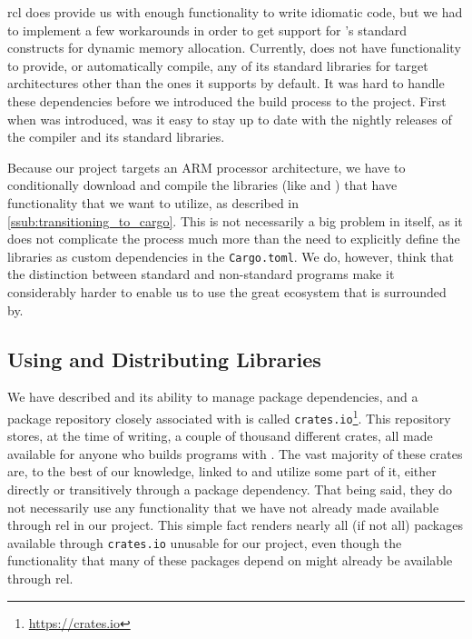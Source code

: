 \gls{rcl} does provide us with enough functionality to write idiomatic {\rust} code, but we had to implement a few workarounds in order to get support for {\rust}'s standard constructs for dynamic memory allocation.
Currently, {\rust} does not have functionality to provide, or automatically compile, any of its standard libraries for target architectures other than the ones it supports by default.
It was hard to handle these dependencies before we introduced the {\cargo} build process to the project.
First when {\cargo} was introduced, was it easy to stay up to date with the nightly releases of the {\rust} compiler and its standard libraries.

Because our project targets an ARM processor architecture, we have to conditionally download and compile the libraries (like  and ) that have functionality that we want to utilize, as described in \autoref{ssub:transitioning_to_cargo}.
This is not necessarily a big problem in itself, as it does not complicate the process much more than the need to explicitly define the libraries as custom dependencies in the \texttt{Cargo.toml}.
We do, however, think that the distinction between standard and non-standard programs make it considerably harder to enable us to use the great ecosystem that {\rust} is surrounded by.

\subsection{Using and Distributing Libraries}

We have described {\cargo} and its ability to manage package dependencies, and a package repository closely associated with {\cargo} is called \texttt{crates.io}\footnote{\url{https://crates.io}}.
This repository stores, at the time of writing, a couple of thousand different {\rust} crates, all made available for anyone who builds {\rust} programs with {\cargo}.
The vast majority of these crates are, to the best of our knowledge, linked to {\std} and utilize some part of it, either directly or transitively through a package dependency.
That being said, they do not necessarily use any functionality that we have not already made available through \gls{rel} in our project.
This simple fact renders nearly all (if not all) packages available through \texttt{crates.io} unusable for our project, even though the functionality that many of these packages depend on might already be available through \gls{rel}.

